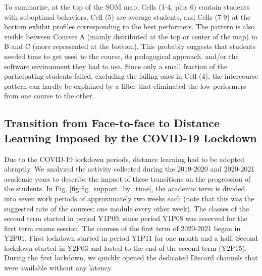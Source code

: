 \documentclass{aims} %
\theoremstyle{definition}
\begin{document}
To summarize, at the top of the SOM map, Cells (1-4, plus 6) contain
students with suboptimal behaviors, Cell (5) are average students, and
Cells (7-9) at the bottom exhibit profiles corresponding to the best
performers. The pattern is also visible between Courses A (mainly
distributed at the top or center of the map) to B and C (more
represented at the bottom). This probably suggests that students needed
time to get used to the course, its pedagogical approach, and/or the
software environment they had to use. Since only a small fraction of the
participating students failed, excluding the failing ones in Cell (4),
the intercourse pattern can hardly be explained by a filter that
eliminated the low performers from one course to the other.

\hypertarget{transition-from-face-to-face-to-distance-learning-imposed-by-the-covid-19-lockdown-1}{%
\subsection{Transition from Face-to-face to Distance Learning Imposed by
the COVID-19
Lockdown}\label{transition-from-face-to-face-to-distance-learning-imposed-by-the-covid-19-lockdown-1}}

Due to the COVID-19 lockdown periods, distance learning had to be
adopted abruptly. We analyzed the activity collected during the
2019-2020 and 2020-2021 academic years to describe the impact of these
transitions on the progression of the students. In Fig.
\ref{fig:fig_support_by_time}, the academic term is divided into seven
work periods of approximately two weeks each (note that this was the
suggested rate of the courses: one module every other week). The classes
of the second term started in period Y1P09, since period Y1P08 was
reserved for the first term exams session. The courses of the first term
of 2020-2021 began in Y2P01. First lockdown started in period Y1P11 for
one month and a half. Second lockdown started in Y2P03 and lasted to the
end of the second term (Y2P15). During the first lockdown, we quickly
opened the dedicated Discord channels that were available without any
latency.
\end{document}
